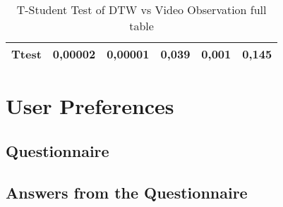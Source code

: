 \begin{table}[]
{\begin{tabular}{ccccccccccc}
\multicolumn{1}{|c|}{\textbf{Ttest}}    & \multicolumn{2}{c|}{0,00002}                                                 & \multicolumn{2}{c|}{0,00001}                                                 & \multicolumn{2}{c|}{0,039}                                                   & \multicolumn{2}{c|}{0,001}                                                   & \multicolumn{2}{c|}{0,145}                                                   \\ \hline
\end{tabular}
}
\caption{T-Student Test of DTW vs Video Observation full table}
\label{table:ttestfull}
\end{table}



\chapter{User Preferences}

\section{Questionnaire}
\label{appendix_questionnaire}

\begin{center}

\end{center}

\section{Answers from the Questionnaire}

